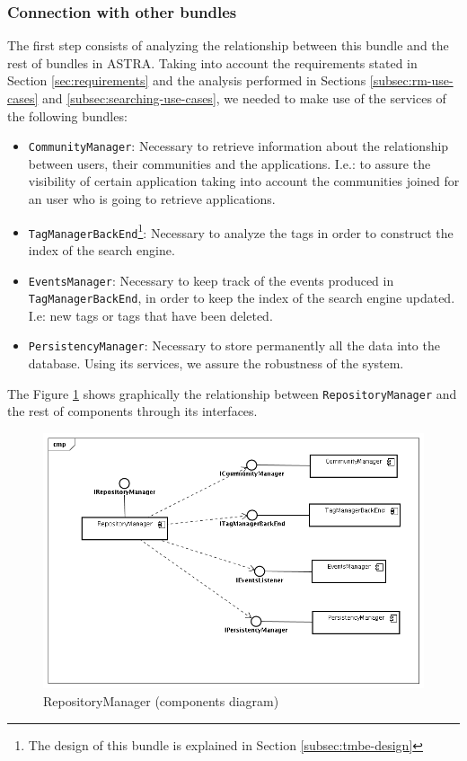 \subsubsection{Connection with other bundles}
\label{subsubsec:connections-rm}
The first step consists of analyzing the relationship between this bundle and
the rest of bundles in ASTRA.
Taking into account the requirements stated in Section \ref{sec:requirements}
and the analysis performed in Sections \ref{subsec:rm-use-cases} and
\ref{subsec:searching-use-cases}, we needed to make use of the services of  the
following bundles:

\begin{itemize}
  \item \verb|CommunityManager|: Necessary to retrieve information about the
  relationship between users, their communities and the applications. I.e.: to
  assure the visibility of certain application taking into account the
  communities joined for an user who is going to retrieve applications.
  \item \verb|TagManagerBackEnd|\footnote{The design of this bundle is explained
  in Section \ref{subsec:tmbe-design}}: Necessary to analyze the tags in order to
  construct the index of the search engine.
  \item \verb|EventsManager|: Necessary to keep track of the events produced
  in\\ \verb|TagManagerBackEnd|, in order to keep the index of the search engine updated.
  I.e: new tags or tags that have been deleted.
  \item \verb|PersistencyManager|: Necessary to store permanently all the data
  into the database. Using its services, we assure the robustness of the system.
\end{itemize}

The Figure \ref{img:rm-components} shows graphically the relationship between
\verb|RepositoryManager| and the rest of components through its interfaces.

\begin{figure}[h!]
 \begin{center}
 \includegraphics[scale=0.4]{diagrams/RepositoryManagerComponentsDiagram.png}
  \caption{\label{img:rm-components}RepositoryManager (components diagram)}
 \end{center}
\end{figure}

